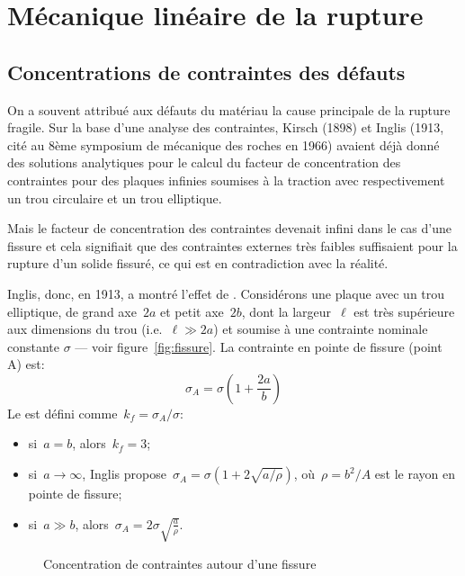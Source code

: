 \medskip
\section{Mécanique linéaire de la rupture}

\medskip
\subsection{Concentrations de contraintes des défauts}

\begin{histoire}%
On a souvent attribué aux défauts du matériau la cause principale de la rupture fragile. Sur la base d'une analyse des contraintes, Kirsch (1898) et Inglis (1913, cité au 8ème symposium de mécanique des roches en 1966) avaient déjà donné des solutions analytiques pour le calcul du facteur de concentration des contraintes pour des plaques infinies soumises à la traction avec respectivement un trou circulaire et un trou elliptique.

\medskip
Mais le facteur de concentration des contraintes devenait infini dans le cas d'une fissure et cela signifiait que des contraintes externes très faibles suffisaient pour la rupture d'un solide fissuré, ce qui est en contradiction avec la réalité.
\end{histoire}

\medskip
Inglis, donc, en 1913, a montré l'effet de .
\medskipvm
Considérons une plaque avec un trou elliptique, de grand axe~$2a$ et petit axe~$2b$, dont la largeur~$\ell$ est très supérieure aux dimensions du trou (i.e.~$\ell\gg 2a$) et soumise à une contrainte nominale constante $\sigma$ --- voir figure~\ref{fig:fissure}. La contrainte en pointe de fissure (point A) est:
\begin{equation} \sigma_A = \sigma \left( 1+\frac{2a}b\right) \end{equation}
Le  est défini comme~$k_f = \sigma_A/\sigma$:
\begin{itemize}
  \item si~$a=b$, alors~$k_f=3$;
  \item si~$a\rightarrow\infty$, Inglis propose~$\sigma_A=\sigma (1+2\sqrt{a/\rho})$,
	où~$\rho=b^2/A$ est le rayon en pointe de fissure;
  \item si~$a\gg b$, alors~$\sigma_A=2\sigma \sqrt{\frac{a}{\rho}}$.
\end{itemize}
\begin{figure}[ht]\centering
{}\hspace{7em}
\caption{Concentration de contraintes autour d'une fissure}
\end{figure}

